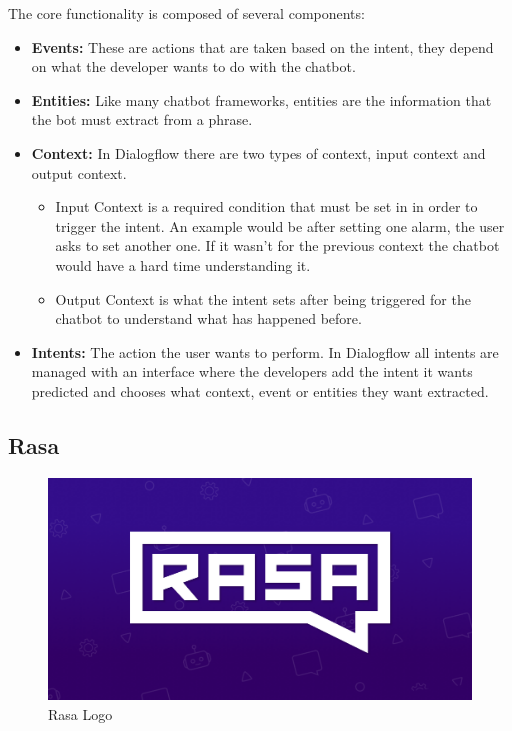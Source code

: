 The core functionality is composed of several components:\\
\begin{itemize}
	\item {\textbf{Events:} These are actions that are taken based on the intent, they depend on what the developer wants to do with the chatbot.}
	\item {\textbf{Entities:} Like many chatbot frameworks, entities are the information that the bot must extract from a phrase.}
	\item {\textbf{Context:} In Dialogflow there are two types of context, input context and output context.\\
			\begin{itemize}
				\item {Input Context is a required condition that must be set in in order to trigger the intent. An example would be after setting one alarm, the user asks to set another one. If it wasn’t for the previous context the chatbot would have a hard time understanding it.}
				\item {Output Context is what the intent sets after being triggered for the chatbot to understand what has happened before.}
			\end{itemize}
			}
	\item {\textbf{Intents:} The action the user wants to perform. In Dialogflow all intents are managed with an interface where the developers add the intent it wants predicted and chooses what context, event or entities they want extracted.}
\end{itemize}

\clearpage

\subsection{Rasa}\label{sec:chap3_rasa}

\begin{center}
	\begin{figure}[h!]
		\centering
		\includegraphics[scale=0.4]{./images/3-rasa-log}
		\caption{Rasa Logo}
		\label{rasa_logo}
	\end{figure}
\end{center}

